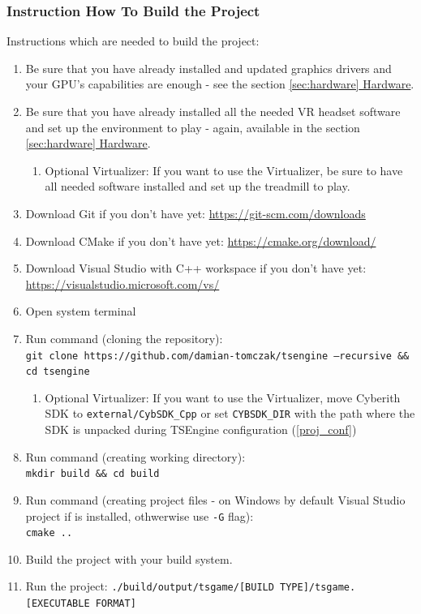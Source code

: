 \subsubsection{Instruction How To Build the Project}
\hspace{\parindent} Instructions which are needed to build the project:
\label{sec:how_to_run}
\begin{enumerate}
    \item Be sure that you have already installed and updated graphics drivers and your GPU's capabilities are enough - see the section \hyperref[sec:hardware]{\ref*{sec:hardware} Hardware}.
    \item Be sure that you have already installed all the needed VR headset software and set up the environment to play - again, available in the section \hyperref[sec:hardware]{\ref*{sec:hardware} Hardware}.
    \begin{enumerate}
        \item Optional Virtualizer: If you want to use the Virtualizer, be sure to have all needed software installed and set up the treadmill to play.
    \end{enumerate}
    \item Download Git if you don't have yet:
        \href{https://git-scm.com/downloads}{https://git-scm.com/downloads}
    \item Download CMake if you don't have yet:
        \href{https://cmake.org/download/}{https://cmake.org/download/}
    \item Download Visual Studio with C++ workspace if you don't have yet:
        \href{https://visualstudio.microsoft.com/vs/}{https://visualstudio.microsoft.com/vs/}
    \item Open system terminal
    \item Run command (cloning the repository):\\
        \texttt{git clone https://github.com/damian-tomczak/tsengine --recursive \&\& cd tsengine}
    \begin{enumerate}
        \item Optional Virtualizer: If you want to use the Virtualizer, move Cyberith SDK to \texttt{external/CybSDK\_Cpp} or set \texttt{CYBSDK\_DIR} with the path where the SDK is unpacked during TSEngine configuration (\ref{proj_conf})
    \end{enumerate}
    \item Run command (creating working directory):\\
        \texttt{mkdir build \&\& cd build}
    \item Run command (creating project files - on Windows by default Visual Studio project if is installed, othwerwise use \texttt{-G} flag):\\
        \texttt{cmake ..}
    \label{proj_conf}
    \item Build the project with your build system.
    \item Run the project: \texttt{./build/output/tsgame/[BUILD TYPE]/tsgame.[EXECUTABLE FORMAT]}
\end{enumerate}

